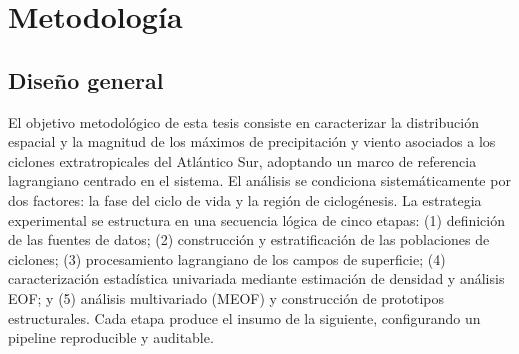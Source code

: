 \chapter{Metodología}\label{ch:metodologia}

%
%


\section{Diseño general}\label{sec:diseno_general}

El objetivo metodológico de esta tesis consiste en caracterizar la distribución espacial y la magnitud de los máximos de precipitación y viento asociados a los ciclones extratropicales del Atlántico Sur, adoptando un marco de referencia lagrangiano centrado en el sistema. El análisis se condiciona sistemáticamente por dos factores: la fase del ciclo de vida y la región de ciclogénesis. La estrategia experimental se estructura en una secuencia lógica de cinco etapas: (1) definición de las fuentes de datos; (2) construcción y estratificación de las poblaciones de ciclones; (3) procesamiento lagrangiano de los campos de superficie; (4) caracterización estadística univariada mediante estimación de densidad y análisis EOF; y (5) análisis multivariado (MEOF) y construcción de prototipos estructurales. Cada etapa produce el insumo de la siguiente, configurando un pipeline reproducible y auditable.

